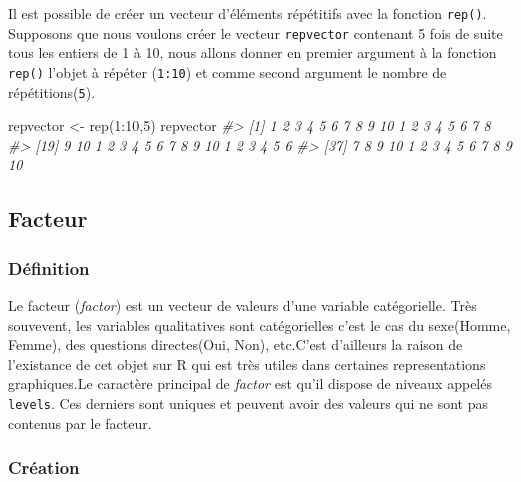 \documentclass[
]{book}
\newenvironment{Shaded}{\begin{snugshade}}{\end{snugshade}}
\newcommand{\CommentTok}[1]{\textcolor[rgb]{0.56,0.35,0.01}{\textit{#1}}}
\newcommand{\DecValTok}[1]{\textcolor[rgb]{0.00,0.00,0.81}{#1}}
\newcommand{\FunctionTok}[1]{\textcolor[rgb]{0.00,0.00,0.00}{#1}}
\newcommand{\NormalTok}[1]{#1}
\newcommand{\OtherTok}[1]{\textcolor[rgb]{0.56,0.35,0.01}{#1}}
\newcommand{\SpecialCharTok}[1]{\textcolor[rgb]{0.00,0.00,0.00}{#1}}
\theoremstyle{definition}
\theoremstyle{definition}
\theoremstyle{definition}
\theoremstyle{definition}
\theoremstyle{remark}
\begin{document}
Il est possible de créer un vecteur d'éléments répétitifs avec la fonction \texttt{rep()}. Supposons que nous voulons créer le vecteur \texttt{repvector} contenant 5 fois de suite tous les entiers de 1 à 10, nous allons donner en premier argument à la fonction \texttt{rep()} l'objet à répéter (\texttt{1:10}) et comme second argument le nombre de répétitions(\texttt{5}).

\begin{Shaded}
\begin{Highlighting}[]
\NormalTok{repvector }\OtherTok{\textless{}{-}} \FunctionTok{rep}\NormalTok{(}\DecValTok{1}\SpecialCharTok{:}\DecValTok{10}\NormalTok{,}\DecValTok{5}\NormalTok{)}
\NormalTok{repvector}
\CommentTok{\#\textgreater{}  [1]  1  2  3  4  5  6  7  8  9 10  1  2  3  4  5  6  7  8}
\CommentTok{\#\textgreater{} [19]  9 10  1  2  3  4  5  6  7  8  9 10  1  2  3  4  5  6}
\CommentTok{\#\textgreater{} [37]  7  8  9 10  1  2  3  4  5  6  7  8  9 10}
\end{Highlighting}
\end{Shaded}

\hypertarget{facteur}{%
\subsection{Facteur}\label{facteur}}

\hypertarget{duxe9finition-1}{%
\subsubsection*{Définition}\label{duxe9finition-1}}

Le facteur (\emph{factor}) est un vecteur de valeurs d'une variable catégorielle. Très souvevent, les variables qualitatives sont catégorielles c'est le cas du sexe(Homme, Femme), des questions directes(Oui, Non), etc.C'est d'ailleurs la raison de l'existance de cet objet sur R qui est très utiles dans certaines representations graphiques.Le caractère principal de \emph{factor} est qu'il dispose de niveaux appelés \texttt{levels}. Ces derniers sont uniques et peuvent avoir des valeurs qui ne sont pas contenus par le facteur.

\hypertarget{cruxe9ation-1}{%
\subsubsection*{Création}\label{cruxe9ation-1}}
\end{document}
